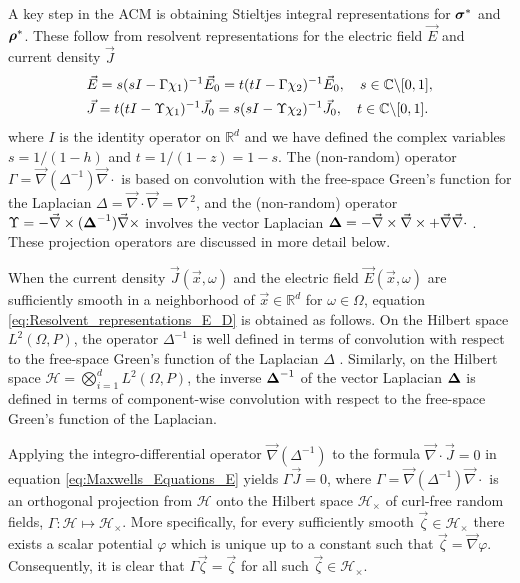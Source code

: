 \documentclass{cmslatex}
\newcommand\bsig{\mbox{\boldmath${\sigma}$}}
\newcommand\brho{\mbox{\boldmath${\rho}$}}
\newcommand\bDelta{\mbox{\boldmath${\Delta}$}}
\begin{document}
A key step in the ACM is
obtaining Stieltjes integral representations for $\bsig^*$ and
$\brho^*$. These follow from resolvent representations for the
electric field $\vec{E}$ \cite{Golden:CMP-473} and current density
$\vec{J}$ \cite{Murphy:JMP:063506}         
%
\begin{align}\label{eq:Resolvent_representations_E_D}
  &\vec{E}=s(sI-\Gamma\chi_1)^{-1}\vec{E}_0=t(tI-\Gamma\chi_2)^{-1}\vec{E}_0 ,
  \quad
   s\in\mathbb{C}\backslash[0,1],\\
  &\vec{J}=t(tI-\Upsilon\chi_1)^{-1}\vec{J}_0=s(sI-\Upsilon\chi_2)^{-1}\vec{J}_0 ,
  \quad
   t\in\mathbb{C}\backslash[0,1].\notag 
\end{align}
%
where $I$ is the identity operator on $\mathbb{R}^d$ and we have
defined the complex variables $s=1/(1-h)$ and $t=1/(1-z)=1-s$. 
The (non-random) operator $\Gamma=\vec{\nabla}(\Delta^{-1})\vec{\nabla}\cdot$ is based on
convolution with the free-space Green's function for the Laplacian
$\Delta=\vec{\nabla}\cdot\vec{\nabla}=\nabla^{\,2}$, and the (non-random) operator
$\Upsilon=-\vec{\nabla}\times(\bDelta^{-1})\vec{\nabla}\times$ involves the vector Laplacian
$\bDelta=- \vec{\nabla}\times\vec{\nabla}\times + \vec{\nabla}\vec{\nabla}\cdot $
\cite{Golden:CMP-473,Murphy:JMP:063506}. These projection operators
are discussed in more detail below.      



When the current density $\vec{J}(\vec{x},\omega)$ and the electric
field $\vec{E}(\vec{x},\omega)$ are sufficiently smooth in a neighborhood
of $\vec{x}\in\mathbb{R}^d$ for $\omega\in\Omega$, equation
\eqref{eq:Resolvent_representations_E_D} is obtained as
follows. On the Hilbert space $L^2(\Omega,P)$, the operator $\Delta^{-1}$ is
well defined in terms of convolution with respect to the free-space
Green's function of the Laplacian $\Delta$
\cite{Golden:CMP-473,Folland:95}. Similarly, on the Hilbert space 
$\mathscr{H}=\bigotimes_{i=1}^dL^2(\Omega,P)$, the inverse $\bDelta^{-1}$ of the
vector Laplacian $\bDelta$ is defined in terms of component-wise
convolution with respect to the free-space Green's function of the
Laplacian.

 

Applying the integro-differential operator $\vec{\nabla}(\Delta^{-1})$ to the
formula $\vec{\nabla}\cdot\vec{J}=0$ in equation
\eqref{eq:Maxwells_Equations_E} yields $\Gamma\vec{J}=0$, where
$\Gamma=\vec{\nabla}(\Delta^{-1})\vec{\nabla}\cdot$ is an orthogonal projection
\cite{Golden:CMP-473} from $\mathscr{H}$ onto the Hilbert space
$\mathscr{H}_\times$ of curl-free random fields,
$\Gamma:\mathscr{H}\mapsto\mathscr{H}_\times$. More specifically, for every
sufficiently smooth $\vec{\zeta}\in\mathscr{H}_\times$ there exists
\cite{Jackson-1999} a scalar potential $\varphi$ which is unique up to a 
constant such that $\vec{\zeta}=\vec{\nabla}\varphi$. Consequently, it is clear
that $\Gamma\vec{\zeta}=\vec{\zeta}$ for all such $\vec{\zeta}\in\mathscr{H}_\times$. 
\end{document}
